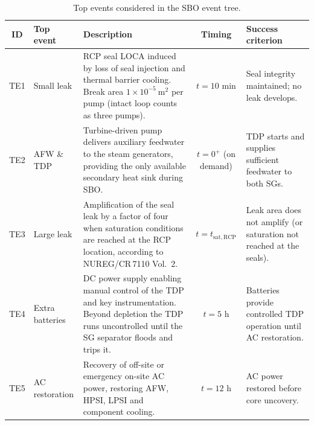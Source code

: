 \documentclass[a4paper,11pt]{article}
\numberwithin{subsubsection}{subsection}
\numberwithin{subsection}{section}
\begin{document}
\begin{table}[H]
\centering
\caption{Top events considered in the SBO event tree.}
\label{tab:top_events}
\renewcommand{\arraystretch}{1.25}
\begin{tabular}{@{}cl>{\raggedright\arraybackslash}p{4.6cm}c>{\raggedright\arraybackslash}p{3.6cm}@{}}
\toprule
\textbf{ID} & \textbf{Top event} & \textbf{Description} & \textbf{Timing} & \textbf{Success criterion} \\
\midrule
TE1 & Small leak &
RCP seal LOCA induced by loss of seal injection and thermal barrier cooling. Break area $1\times 10^{-5}\ \mathrm{m^2}$ per pump (intact loop counts as three pumps). &
$t = 10$ min &
Seal integrity maintained; no leak develops. \\

TE2 & AFW \& TDP &
Turbine-driven pump delivers auxiliary feedwater to the steam generators, providing the only available secondary heat sink during SBO. &
$t = 0^{+}$ (on demand) &
TDP starts and supplies sufficient feedwater to both SGs. \\

TE3 & Large leak &
Amplification of the seal leak by a factor of four when saturation conditions are reached at the RCP location, according to NUREG/CR\,7110 Vol.~2. &
$t = t_{\mathrm{sat,RCP}}$ &
Leak area does not amplify (or saturation not reached at the seals). \\

TE4 & Extra batteries &
DC power supply enabling manual control of the TDP and key instrumentation. Beyond depletion the TDP runs uncontrolled until the SG separator floods and trips it. &
$t = 5$ h &
Batteries provide controlled TDP operation until AC restoration. \\

TE5 & AC restoration &
Recovery of off-site or emergency on-site AC power, restoring AFW, HPSI, LPSI and component cooling. &
$t = 12$ h &
AC power restored before core uncovery. \\
\bottomrule
\end{tabular}
\label{TOPEVENTS}
\end{table}
\end{document}

